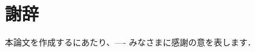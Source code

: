 \documentclass[12pt,a4j]{jreport}
\begin{document}
\chapter*{謝辞} %
本論文を作成するにあたり、---- みなさまに感謝の意を表します．


\renewcommand{\bibname}{参考文献} %
\end{document}
